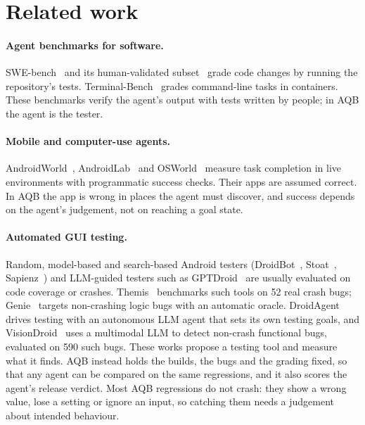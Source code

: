 \documentclass[11pt]{article}
\newcommand{\aqb}{\textsc{AQB}}
\begin{document}
\section{Related work}

\paragraph{Agent benchmarks for software.}
SWE-bench~\cite{jimenez2024swebench} and its human-validated subset~\cite{openai2024sweverified}
grade code changes by running the repository's tests. Terminal-Bench~\cite{merrill2026terminalbench}
grades command-line tasks in containers. These benchmarks verify the agent's output with tests
written by people; in \aqb{} the agent is the tester.

\paragraph{Mobile and computer-use agents.}
AndroidWorld~\cite{rawles2025androidworld}, AndroidLab~\cite{xu2024androidlab} and
OSWorld~\cite{xie2024osworld} measure task completion in live environments with programmatic
success checks. Their apps are assumed correct. In \aqb{} the app is wrong in places the agent
must discover, and success depends on the agent's judgement, not on reaching a goal state.

\paragraph{Automated GUI testing.}
Random, model-based and search-based Android testers (DroidBot~\cite{li2017droidbot},
Stoat~\cite{su2017stoat}, Sapienz~\cite{mao2016sapienz}) and LLM-guided testers such as
GPTDroid~\cite{liu2024gptdroid} are usually evaluated on code coverage or crashes. Themis~\cite{su2021themis}
benchmarks such tools on 52 real crash bugs; Genie~\cite{su2021genie} targets non-crashing logic
bugs with an automatic oracle. DroidAgent~\cite{yoon2024droidagent} drives testing with an autonomous
LLM agent that sets its own testing goals, and VisionDroid~\cite{liu2025visiondroid} uses a multimodal
LLM to detect non-crash functional bugs, evaluated on 590 such bugs. These works propose a testing
tool and measure what it finds. \aqb{} instead holds the builds, the bugs and the grading fixed, so
that any agent can be compared on the same regressions, and it also scores the agent's release
verdict. Most \aqb{} regressions do not crash: they show a wrong value, lose a setting or ignore an
input, so catching them needs a judgement about intended behaviour.
\end{document}
